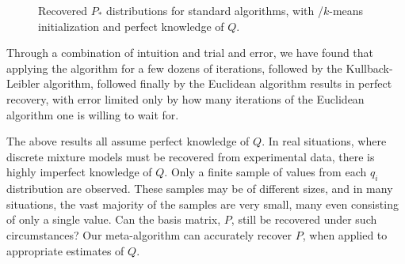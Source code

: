 \documentclass[conference]{IEEEtran}
\begin{document}
\begin{figure}[t]
\begin{center}
\end{center}
\caption{Recovered $P_*$ distributions for standard  algorithms, with /$k$-means initialization and perfect knowledge of $Q$.}
\end{figure}


Through a combination of intuition and trial and error, we have found that applying the  algorithm for a few dozens of iterations, followed by the Kullback-Leibler algorithm, followed finally by the Euclidean algorithm results in perfect recovery, with error limited only by how many iterations of the Euclidean algorithm one is willing to wait for.

The above results all assume perfect knowledge of $Q$.
In real situations, where discrete mixture models must be recovered from experimental data, there is highly imperfect knowledge of $Q$.
Only a finite sample of values from each $q_i$ distribution are observed.
These samples may be of different sizes, and in many situations, the vast majority of the samples are very small, many even consisting of only a single value.
Can the basis matrix, $P$, still be recovered under such circumstances?
Our meta-algorithm can accurately recover $P$, when applied to appropriate estimates of $Q$.
\end{document}
